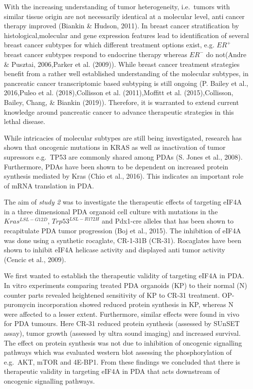 \documentclass[12pt,openany]{book}
\begin{document}
With the increasing understanding of tumor heterogeneity, i.e.~tumors
with similar tissue origin are not necessarily identical at a molecular
level, anti cancer therapy improved (Biankin \& Hudson, 2011). In breast
cancer stratification by histological,molecular and gene expression
features lead to identification of several breast cancer subtypes for
which different treatment options exist, e.g. \(ER^+\) breast cancer
subtypes respond to endocrine therapy whereas \(ER^-\) do not(Andre \&
Pusztai, 2006,Parker et al. (2009)). While breast cancer treatment
strategies benefit from a rather well established understanding of the
molecular subtypes, in pancreatic cancer transcriptomic based subtyping
is still ongoing (P. Bailey et al., 2016,Puleo et al. (2018),Collisson
et al. (2011),Moffitt et al. (2015),Collisson, Bailey, Chang, \& Biankin
(2019)). Therefore, it is warranted to extend current knowledge around
pancreatic cancer to advance therapeutic strategies in this lethal
disease.

While intricacies of molecular subtypes are still being investigated,
research has shown that oncogenic mutations in KRAS as well as
inactivation of tumor supressors e.g.~TP53 are commonly shared among
PDAs (S. Jones et al., 2008). Furthermore, PDAs have been shown to be
dependent on increased protein synthesis mediated by Kras (Chio et al.,
2016). This indicates an important role of mRNA translation in PDA.

The aim of \emph{study 2} was to investigate the therapeutic effects of
targeting eIF4A in a three dimensional PDA organoid cell culture with
mutations in the \(Kras^{LSL-G12D}\), \(Trp53^{LSL-R172H}\) and Pdx1-cre
alleles that has been shown to recapitulate PDA tumor progression (Boj
et al., 2015). The inhibition of eIF4A was done using a synthetic
rocaglate, CR-1-31B (CR-31). Rocaglates have been shown to inhibit eIF4A
helicase activity and displayed anti tumor activity (Cencic et al.,
2009).

We first wanted to establish the therapeutic validity of targeting eIF4A
in PDA. In vitro experiments comparing treated PDA organoids (KP) to
their normal (N) counter parts revealed heightened sensitivity of KP to
CR-31 treatment. OP-puromycin incorporation showed reduced protein
synthesis in KP, whereas N were affected to a lesser extent.
Furthermore, similar effects were found in vivo for PDA tumours. Here
CR-31 reduced protein synthesis (assessed by SUnSET assay), tumor growth
(assessed by ultra sound imaging) and increased survival. The effect on
protein synthesis was not due to inhibition of oncogenic signalling
pathways which was evaluated western blot assessing the phosphorylation
of e.g.~AKT, mTOR and 4E-BP1. From these findings we concluded that
there is therapeutic validity in targeting eIF4A in PDA that acts
downstream of oncogenic signalling pathways.
\end{document}
